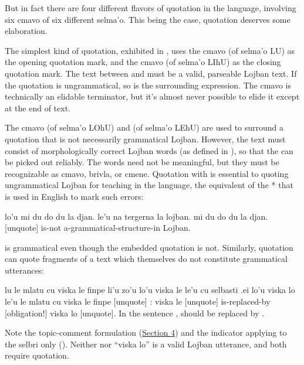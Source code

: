 But in fact there are four different flavors of quotation in
    the language, involving six cmavo of six different selma'o.
    This being the case, quotation deserves some elaboration.

The simplest kind of quotation, exhibited in , uses the cmavo  (of selma'o
    LU) as the opening quotation mark, and the cmavo  (of
    selma'o LIhU) as the closing quotation mark. The text between
     and  must be a valid, parseable Lojban text. If
    the quotation is ungrammatical, so is the surrounding
    expression. The cmavo  is technically an elidable
    terminator, but it's almost never possible to elide it except
    at the end of text.

The cmavo  (of selma'o LOhU) and  (of
    selma'o LEhU) are used to surround a quotation that is not
    necessarily grammatical Lojban. However, the text must consist
    of morphologically correct Lojban words (as defined in ), so that the  can be
    picked out reliably. The words need not be meaningful, but they
    must be recognizable as cmavo, brivla, or cmene. Quotation with
     is essential to quoting ungrammatical Lojban for
    teaching in the language, the equivalent of the * that is used
    in English to mark such errors:
\begin{example}
lo'u mi du do du la djan. le'u\n
\T	na tergerna la lojban.\n
{} mi du do du la djan. [unquote]\n
\T	is-not a-grammatical-structure-in Lojban.
\end{example}

 is grammatical even though the
    embedded quotation is not. Similarly,  quotation can
    quote fragments of a text which themselves do not constitute
    grammatical utterances:
\begin{example}
lu le mlatu cu viska le finpe li'u zo'u\n
\T	lo'u viska le le'u\n
\T	cu selbasti .ei\n
\T	lo'u viska lo le'u\n
{} le mlatu cu viska le finpe [unquote] :\n
\T	[quote] viska le [unquote]\n
\T	is-replaced-by [obligation!]\n
\T	[quote] viska lo [unquote].\n
In the sentence ,\n
\T	{} should be replaced by .
\end{example}

Note the topic-comment formulation (\hyperref[sec:19:4]{Section
    4}) and the indicator applying to the selbri only (). Neither  nor ``viska
    lo'' is a valid Lojban utterance, and both require 
    quotation.

